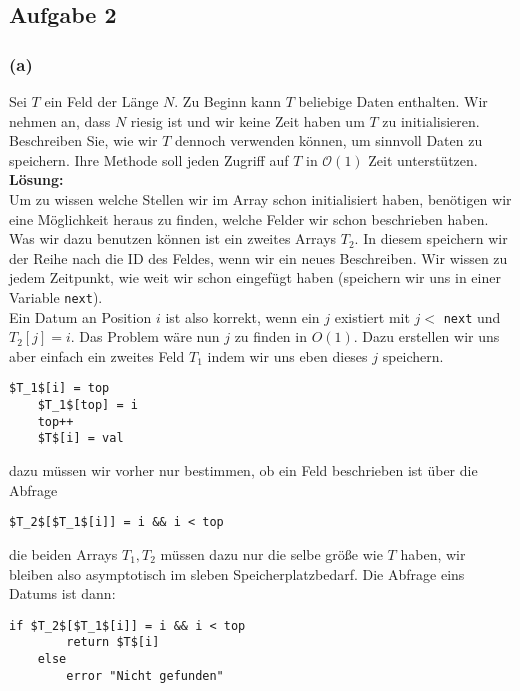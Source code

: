 \documentclass[11pt,a4paper,ngerman]{article}
\begin{document}
\subsection*{Aufgabe 2}

\subsubsection*{(a)}
Sei $T$ ein Feld der Länge $N$. Zu Beginn kann $T$ beliebige Daten enthalten. Wir nehmen an, dass $N$ riesig ist und wir keine Zeit haben um $T$ zu initialisieren. Beschreiben Sie, wie wir $T$ dennoch verwenden können, um sinnvoll Daten zu speichern. Ihre Methode soll jeden Zugriff auf $T$ in $\mathcal{O}(1)$ Zeit unterstützen.\\

\noindent\textbf{Lösung:}\\
Um zu wissen welche Stellen wir im Array schon initialisiert haben, benötigen wir eine Möglichkeit heraus zu finden, welche Felder wir schon beschrieben haben. Was wir dazu benutzen können ist ein zweites Arrays $T_2$. In diesem speichern wir der Reihe nach die ID des Feldes, wenn wir ein neues Beschreiben. Wir wissen zu jedem Zeitpunkt, wie weit wir schon eingefügt haben (speichern wir uns in einer Variable \lstinline|next|).\\

Ein Datum an Position $i$ ist also korrekt, wenn ein $j$ existiert mit $j <$ \lstinline|next| und $T_2[j] = i$. Das Problem wäre nun $j$ zu finden in $O(1)$. Dazu erstellen wir uns aber einfach ein zweites Feld $T_1$ indem wir uns eben dieses $j$ speichern.\\

\begin{lstlisting}[label="Einfügen eines neuen Datums"]
	$T_1$[i] = top
	$T_1$[top] = i
	top++
	$T$[i] = val
\end{lstlisting}
dazu müssen wir vorher nur bestimmen, ob ein Feld beschrieben ist über die Abfrage
\begin{lstlisting}[label="Darum existiert"]
	$T_2$[$T_1$[i]] = i && i < top
\end{lstlisting}
die beiden Arrays $T_1, T_2$ müssen dazu nur die selbe größe wie $T$ haben, wir bleiben also asymptotisch im sleben Speicherplatzbedarf. Die
Abfrage eins Datums ist dann:
\begin{lstlisting}[label="Datum ermitteln"]
	if $T_2$[$T_1$[i]] = i && i < top
		return $T$[i]
	else
		error "Nicht gefunden"
\end{lstlisting}
\end{document}
